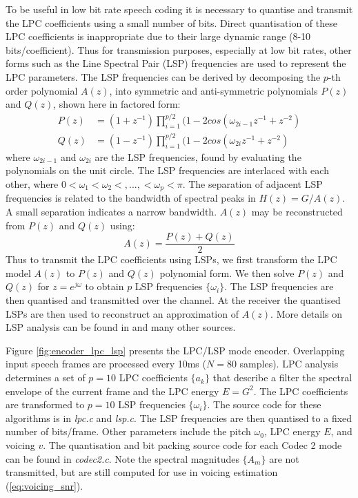 \documentclass{article}
\begin{document}
To be useful in low bit rate speech coding it is necessary to quantise and transmit the LPC coefficients using a small number of bits. Direct quantisation of these LPC coefficients is inappropriate due to their large dynamic range (8-10 bits/coefficient). Thus for transmission purposes, especially at low bit rates, other forms such as the Line Spectral Pair (LSP) \cite{itakura1975line} frequencies are used to represent the LPC parameters. The LSP frequencies can be derived by decomposing the $p$-th order polynomial $A(z)$, into symmetric and anti-symmetric polynomials $P(z)$ and $Q(z)$, shown here in factored form:
\begin{equation}
\begin{split}
P(z) &= (1+z^{-1}) \prod_{i=1}^{p/2} (1 - 2cos(\omega_{2i-1} z^{-1} + z^{-2} ) \\
Q(z) &= (1-z^{-1}) \prod_{i=1}^{p/2} (1 - 2cos(\omega_{2i} z^{-1} + z^{-2} )
\end{split}
\end{equation}
where $\omega_{2i-1}$ and $\omega_{2i}$ are the LSP frequencies, found by evaluating the polynomials on the unit circle. The LSP frequencies are interlaced with each other, where $0<\omega_1 < \omega_2 <,..., < \omega_p < \pi$. The separation of adjacent LSP frequencies is related to the bandwidth of spectral peaks in $H(z)=G/A(z)$. A small separation indicates a narrow bandwidth. $A(z)$ may be reconstructed from $P(z)$ and $Q(z)$ using:
\begin{equation}
A(z) = \frac{P(z)+Q(z)}{2}
\end{equation}
Thus to transmit the LPC coefficients using LSPs, we first transform the LPC model $A(z)$ to $P(z)$ and $Q(z)$ polynomial form. We then solve $P(z)$ and $Q(z)$ for $z=e^{j \omega}$ to obtain $p$ LSP frequencies $\{\omega_i\}$. The LSP frequencies are then quantised and transmitted over the channel. At the receiver the quantised LSPs are then used to reconstruct an approximation of $A(z)$.  More details on LSP analysis can be found in \cite{rowe1997techniques} and many other sources.

Figure \ref{fig:encoder_lpc_lsp} presents the LPC/LSP mode encoder. Overlapping input speech frames are processed every 10ms ($N=80$ samples).  LPC analysis determines a set of $p=10$ LPC coefficients $\{a_k\}$ that describe a filter the spectral envelope of the current frame and the LPC energy $E=G^2$. The LPC coefficients are transformed to $p=10$ LSP frequencies $\{\omega_i\}$. The source code for these algorithms is in \emph{lpc.c} and \emph{lsp.c}.  The LSP frequencies are then quantised to a fixed number of bits/frame.  Other parameters include the pitch $\omega_0$, LPC energy $E$, and voicing $v$.  The quantisation and bit packing source code for each Codec 2 mode can be found in \emph{codec2.c}.  Note the spectral magnitudes $\{A_m\}$ are not transmitted, but are still computed for use in voicing estimation (\ref{eq:voicing_snr}).
\end{document}
